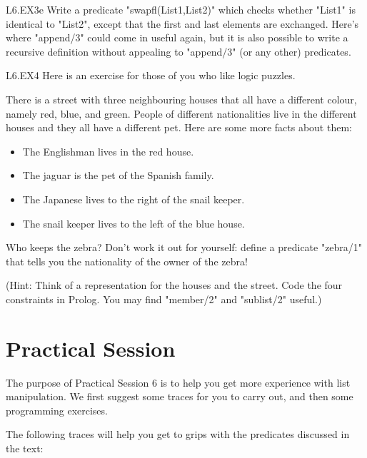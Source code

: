 \begin{LPNexercise}{L6.EX3e}
Write a predicate "swapfl(List1,List2)" which checks whether "List1"
is identical to "List2", except that the first and last elements are
exchanged.  Here's where "append/3" could come in useful again, but it
is also possible to write a recursive definition without appealing to
"append/3" (or any other) predicates.
\end{LPNexercise}





\begin{LPNexercise}{L6.EX4}
Here is an exercise for those of you who like logic
puzzles.

There is a street with three neighbouring houses that all have a
different colour, namely red, blue, and green. People of different
nationalities live in the different houses and they all have a
different pet. Here are some more facts about them:
\begin{itemize}
\item{}The Englishman lives in the red house.
\item{}The jaguar is the pet of the Spanish family.
\item{}The Japanese lives to the right of the snail keeper.
\item{}The snail keeper lives to the left of the blue house.
\end{itemize}
Who keeps the zebra? Don't work it out for yourself:
define a predicate "zebra/1" that tells you the nationality
of the owner of the zebra!

(Hint: Think of a representation for the houses and the street. Code the
four constraints in Prolog. You may find "member/2" and "sublist/2"
useful.)
\end{LPNexercise}


\section{Practical Session}\label{SEC.L6.PRAXIS}



The purpose of Practical Session 6 is to help you get more experience
with list manipulation.  We first suggest some traces for you to carry
out, and then some programming exercises.

The following traces will help you get to grips with the
predicates  discussed in the text:

